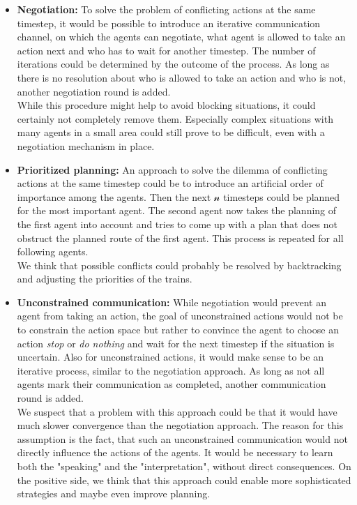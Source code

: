 \begin{itemize}
	\item \textbf{Negotiation:} To solve the problem of conflicting actions at the same timestep, it would be possible to introduce an iterative communication channel, on which the agents can negotiate, what agent is allowed to take an action next and who has to wait for another timestep. The number of iterations could be determined by the outcome of the process. As long as there is no resolution about who is allowed to take an action and who is not, another negotiation round is added.\\
	While this procedure might help to avoid blocking situations, it could certainly not completely remove them. Especially complex situations with many agents in a small area could still prove to be difficult, even with a negotiation mechanism in place.

	\item \textbf{Prioritized planning:} An approach to solve the dilemma of conflicting actions at the same timestep could be to introduce an artificial order of importance among the agents. Then the next $\mathcal{n}$ timesteps could be planned for the most important agent. The second agent now takes the planning of the first agent into account and tries to come up with a plan that does not obstruct the planned route of the first agent. This process is repeated for all following agents.\\
	We think that possible conflicts could probably be resolved by backtracking and adjusting the priorities of the trains.
	
	\item \textbf{Unconstrained communication:} While negotiation would prevent an agent from taking an action, the goal of unconstrained actions would not be to constrain the action space but rather to convince the agent to choose an action \textit{stop} or \textit{do nothing} and wait for the next timestep if the situation is uncertain. Also for unconstrained actions, it would make sense to be an iterative process, similar to the negotiation approach. As long as not all agents mark their communication as completed, another communication round is added.\\
	We suspect that a problem with this approach could be that it would have much slower convergence than the negotiation approach. The reason for this assumption is the fact, that such an unconstrained communication would not directly influence the actions of the agents. It would be necessary to learn both the "speaking" and the "interpretation", without direct consequences. On the positive side, we think that this approach could enable more sophisticated strategies and maybe even improve planning.
	

\end{itemize}
